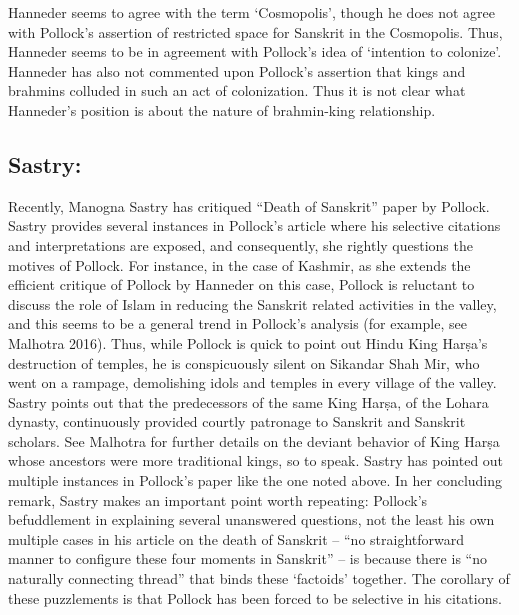 Hanneder seems to agree with the term ‘Cosmopolis’, though he does not agree with Pollock’s assertion of restricted space for Sanskrit in the Cosmopolis. Thus, Hanneder seems to be in agreement with Pollock’s idea of ‘intention to colonize’. Hanneder has also not commented upon Pollock’s assertion that kings and brahmins colluded in such an act of colonization. Thus it is not clear what Hanneder’s position is about the nature of brahmin-king relationship.


\newpage

\subsection*{Sastry:}

\vspace{-.3cm}

Recently, Manogna Sastry has critiqued “Death of Sanskrit” paper by Pollock. Sastry provides several instances in Pollock’s article where his selective citations and interpretations are exposed, and consequently, she rightly questions the motives of Pollock. For instance, in the case of Kashmir, as she extends the efficient critique of Pollock by Hanneder on this case, Pollock is reluctant to discuss the role of Islam in reducing the Sanskrit related activities in the valley, and this seems to be a general trend in Pollock’s analysis (for example, see Malhotra 2016). Thus, while Pollock is quick to point out Hindu King Harṣa’s destruction of temples, he is conspicuously silent on Sikandar Shah Mir, who went on a rampage, demolishing idols and temples in every village of the valley. Sastry points out that the predecessors of the same King Harṣa, of the Lohara dynasty, continuously provided courtly patronage to Sanskrit and Sanskrit scholars. See Malhotra for further details on the deviant behavior of King Harṣa whose ancestors were more traditional kings, so to speak. Sastry has pointed out multiple instances in Pollock’s paper like the one noted above. In her concluding remark, Sastry makes an important point worth repeating: Pollock’s befuddlement in explaining several unanswered questions, not the least his own multiple cases in his article on the death of Sanskrit – “no straightforward manner to configure these four moments in Sanskrit” – is because there is “no naturally connecting thread” that binds these ‘factoids’ together. The corollary of these puzzlements is that Pollock has been forced to be selective in his citations.

